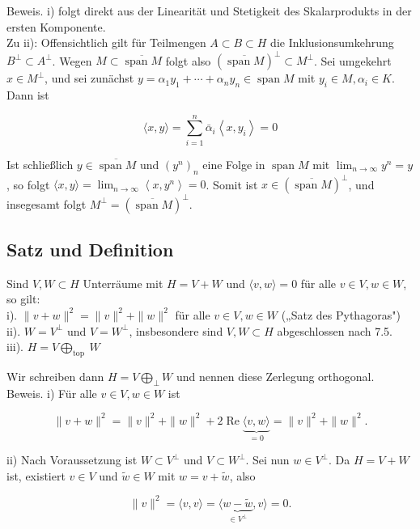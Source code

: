 \documentclass[10pt, letterpaper]{article}
\begin{document}
Beweis. i) folgt direkt aus der Linearität und Stetigkeit des Skalarprodukts in der ersten Komponente.\\
Zu ii): Offensichtlich gilt für Teilmengen $A \subset B \subset H$ die Inklusionsumkehrung $B^{\perp} \subset A^{\perp}$. Wegen $M \subset \overline{\operatorname{span} M}$ folgt also $(\overline{\operatorname{span} M})^{\perp} \subset M^{\perp}$. Sei umgekehrt $x \in M^{\perp}$, und sei zunächst $y=\alpha_{1} y_{1}+\cdots+\alpha_{n} y_{n} \in \operatorname{span} M$ mit $y_{i} \in M, \alpha_{i} \in K$. Dann ist

$$
\langle x, y\rangle=\sum_{i=1}^{n} \bar{\alpha}_{i}\left\langle x, y_{i}\right\rangle=0
$$

Ist schließlich $y \in \overline{\operatorname{span} M}$ und $\left(y^{n}\right)_{n}$ eine Folge in $\operatorname{span} M$ mit $\lim _{n \rightarrow \infty} y^{n}=y$, so folgt $\langle x, y\rangle=\lim _{n \rightarrow \infty}\left\langle x, y^{n}\right\rangle=0$. Somit ist $x \in(\overline{\operatorname{span} M})^{\perp}$, und insegesamt folgt $M^{\perp}= (\overline{\operatorname{span} M})^{\perp}$.

\subsection*{Satz und Definition}
Sind $V, W \subset H$ Unterräume mit $H=V+W$ und $\langle v, w\rangle=0$ für alle $v \in V, w \in W$, so gilt:\\
i). $\|v+w\|^{2}=\|v\|^{2}+\|w\|^{2}$ für alle $v \in V, w \in W$ („Satz des Pythagoras")\\
ii). $W=V^{\perp}$ und $V=W^{\perp}$, insbesondere sind $V, W \subset H$ abgeschlossen nach 7.5.\\
iii). $H=V \bigoplus_{\text {top }} W$

Wir schreiben dann $H=V \bigoplus_{\perp} W$ und nennen diese Zerlegung orthogonal.\\
Beweis. i) Für alle $v \in V, w \in W$ ist

$$
\|v+w\|^{2}=\|v\|^{2}+\|w\|^{2}+2 \operatorname{Re} \underbrace{\langle v, w\rangle}_{=0}=\|v\|^{2}+\|w\|^{2} .
$$

ii) Nach Voraussetzung ist $W \subset V^{\perp}$ und $V \subset W^{\perp}$. Sei nun $w \in V^{\perp}$. Da $H=V+W$ ist, existiert $v \in V$ und $\tilde{w} \in W$ mit $w=v+\tilde{w}$, also

$$
\|v\|^{2}=\langle v, v\rangle=\langle\underbrace{w-\tilde{w}}_{\in V^{\perp}}, v\rangle=0 .
$$
\end{document}
